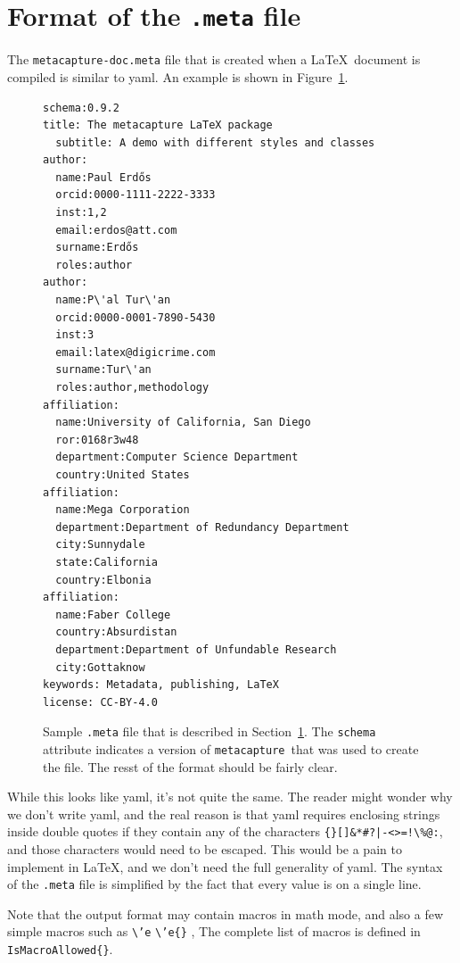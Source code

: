 \documentclass{article}
\newcommand{\pkgname}{\texttt{metacapture}}
\newcommand{\cmd}[2][]{%
  \def\FirstArg{#1}%
  \ifx\FirstArg\empty%
    \texttt{\textbackslash{}#2}%
  \else%
    \texttt{\textbackslash{}#2\{#1\}}%
  \fi
}
\begin{document}
\section{Format of the \texttt{.meta} file}\label{metafile}
The \texttt{metacapture-doc.meta} file that is created when a \LaTeX\ document
is compiled is similar to yaml. An example is shown
in Figure~\ref{samplemeta}.
\begin{figure}
\begin{smalltcolorbox}
\begin{verbatim}
schema:0.9.2
title: The metacapture LaTeX package
  subtitle: A demo with different styles and classes
author:
  name:Paul Erdős
  orcid:0000-1111-2222-3333
  inst:1,2
  email:erdos@att.com
  surname:Erdős
  roles:author
author:
  name:P\'al Tur\'an
  orcid:0000-0001-7890-5430
  inst:3
  email:latex@digicrime.com
  surname:Tur\'an
  roles:author,methodology
affiliation:
  name:University of California, San Diego
  ror:0168r3w48
  department:Computer Science Department
  country:United States
affiliation:
  name:Mega Corporation
  department:Department of Redundancy Department
  city:Sunnydale
  state:California
  country:Elbonia
affiliation:
  name:Faber College
  country:Absurdistan
  department:Department of Unfundable Research
  city:Gottaknow
keywords: Metadata, publishing, LaTeX
license: CC-BY-4.0
\end{verbatim}
\caption{Sample \texttt{.meta} file that is described in Section~\ref{metafile}.
The \texttt{schema} attribute indicates a version of \pkgname\ that
was used to create the file. The resst of the format should be fairly
clear.}
\label{samplemeta}
\end{smalltcolorbox}
\end{figure}
While this looks like yaml, it's not quite the same. The reader
might wonder why we don't write yaml, and the real reason is that yaml
requires enclosing strings inside double quotes if they contain any of the characters
\verb+{}[]&*#?|-<>=!\%@:+, and those characters would need to be escaped.
This would be a pain to implement in \LaTeX, and we don't need the
full generality of yaml.  The syntax of the \texttt{.meta} file is
simplified by the fact that every value is on a single line.

Note that the output format may contain macros in math mode, and also
a few simple macros such as \cmd{'e}, The complete list of macros
is defined in \texttt{IsMacroAllowed\{\}}.
\end{document}

